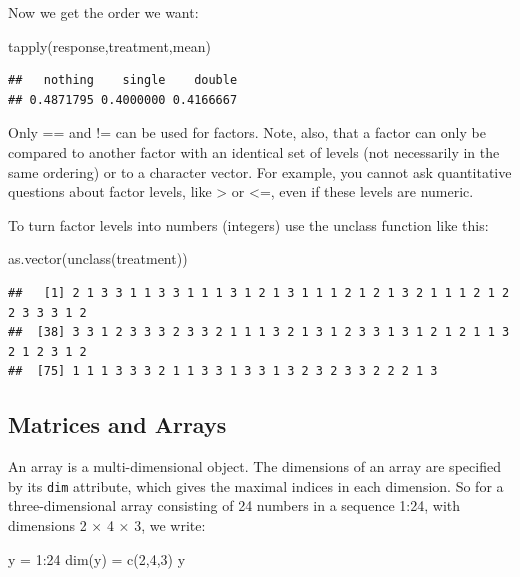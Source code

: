 \documentclass[
]{book}
\newenvironment{Shaded}{\begin{snugshade}}{\end{snugshade}}
\newcommand{\DecValTok}[1]{\textcolor[rgb]{0.00,0.00,0.81}{#1}}
\newcommand{\FunctionTok}[1]{\textcolor[rgb]{0.00,0.00,0.00}{#1}}
\newcommand{\NormalTok}[1]{#1}
\newcommand{\OtherTok}[1]{\textcolor[rgb]{0.56,0.35,0.01}{#1}}
\newcommand{\SpecialCharTok}[1]{\textcolor[rgb]{0.00,0.00,0.00}{#1}}
\begin{document}
Now we get the order we want:

\begin{Shaded}
\begin{Highlighting}[]
\FunctionTok{tapply}\NormalTok{(response,treatment,mean)}
\end{Highlighting}
\end{Shaded}

\begin{verbatim}
##   nothing    single    double 
## 0.4871795 0.4000000 0.4166667
\end{verbatim}

Only == and != can be used for factors. Note, also, that a factor can only be compared to another factor with
an identical set of levels (not necessarily in the same ordering) or to a character vector. For example, you
cannot ask quantitative questions about factor levels, like \textgreater{} or \textless=, even if these levels are numeric.

To turn factor levels into numbers (integers) use the unclass function like this:

\begin{Shaded}
\begin{Highlighting}[]
\FunctionTok{as.vector}\NormalTok{(}\FunctionTok{unclass}\NormalTok{(treatment))}
\end{Highlighting}
\end{Shaded}

\begin{verbatim}
##   [1] 2 1 3 3 1 1 3 3 1 1 1 3 1 2 1 3 1 1 1 2 1 2 1 3 2 1 1 1 2 1 2 2 3 3 3 1 2
##  [38] 3 3 1 2 3 3 3 2 3 3 2 1 1 1 3 2 1 3 1 2 3 3 1 3 1 2 1 2 1 1 3 2 1 2 3 1 2
##  [75] 1 1 1 3 3 3 2 1 1 3 3 1 3 3 1 3 2 3 2 3 3 2 2 2 1 3
\end{verbatim}

\hypertarget{matrices-and-arrays}{%
\subsection{Matrices and Arrays}\label{matrices-and-arrays}}

An array is a multi-dimensional object. The dimensions of an array are specified by its \texttt{dim} attribute, which gives the maximal indices in each dimension. So for a three-dimensional array consisting of 24 numbers in a sequence 1:24, with dimensions 2 × 4 × 3, we write:

\begin{Shaded}
\begin{Highlighting}[]
\NormalTok{y }\OtherTok{=} \DecValTok{1}\SpecialCharTok{:}\DecValTok{24}
\FunctionTok{dim}\NormalTok{(y) }\OtherTok{=} \FunctionTok{c}\NormalTok{(}\DecValTok{2}\NormalTok{,}\DecValTok{4}\NormalTok{,}\DecValTok{3}\NormalTok{)}
\NormalTok{y}
\end{Highlighting}
\end{Shaded}
\end{document}
